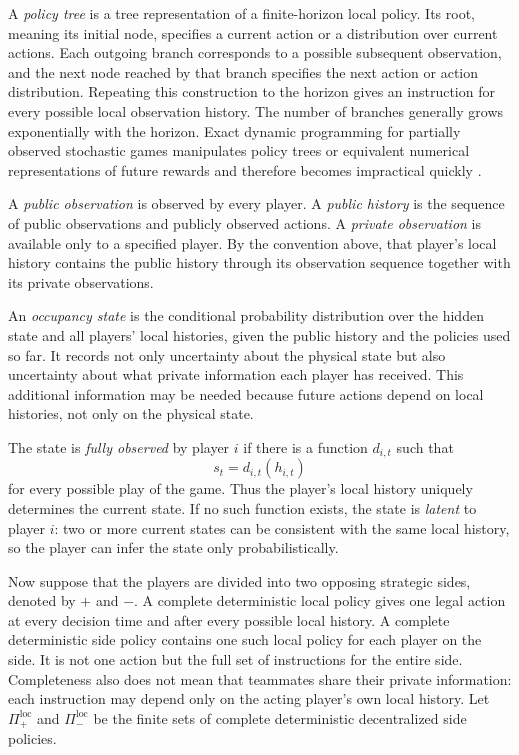 A \emph{policy tree} is a tree representation of a finite-horizon local policy. Its root, meaning its initial node, specifies a current action or a distribution over current actions. Each outgoing branch corresponds to a possible subsequent observation, and the next node reached by that branch specifies the next action or action distribution. Repeating this construction to the horizon gives an instruction for every possible local observation history. The number of branches generally grows exponentially with the horizon. Exact dynamic programming for partially observed stochastic games manipulates policy trees or equivalent numerical representations of future rewards and therefore becomes impractical quickly \cite{hansen2004dynamic}.

A \emph{public observation} is observed by every player. A \emph{public history} is the sequence of public observations and publicly observed actions. A \emph{private observation} is available only to a specified player. By the convention above, that player's local history contains the public history through its observation sequence together with its private observations.

An \emph{occupancy state} is the conditional probability distribution over the hidden state and all players' local histories, given the public history and the policies used so far. It records not only uncertainty about the physical state but also uncertainty about what private information each player has received. This additional information may be needed because future actions depend on local histories, not only on the physical state.

The state is \emph{fully observed} by player $i$ if there is a function $d_{i,t}$ such that
\[
    s_t=d_{i,t}(h_{i,t})
\]
for every possible play of the game. Thus the player's local history uniquely determines the current state. If no such function exists, the state is \emph{latent} to player $i$: two or more current states can be consistent with the same local history, so the player can infer the state only probabilistically.

Now suppose that the players are divided into two opposing strategic sides, denoted by $+$ and $-$. A complete deterministic local policy gives one legal action at every decision time and after every possible local history. A complete deterministic side policy contains one such local policy for each player on the side. It is not one action but the full set of instructions for the entire side. Completeness also does not mean that teammates share their private information: each instruction may depend only on the acting player's own local history. Let $\Pi^{\mathrm{loc}}_+$ and $\Pi^{\mathrm{loc}}_-$ be the finite sets of complete deterministic decentralized side policies.

